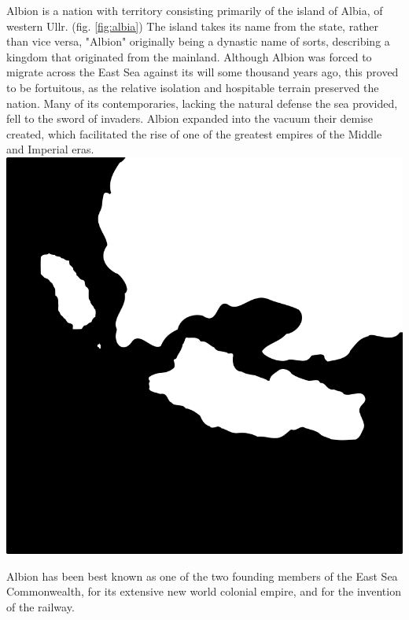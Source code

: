 

	Albion is a nation with territory consisting primarily of the island of Albia, of western Ullr. (fig. \ref{fig:albia})  The island takes its name from the state, rather than vice versa, "Albion" originally being a dynastic name of sorts, describing a kingdom that originated from the mainland.  Although Albion was forced to migrate across the East Sea against its will some thousand years ago, this proved to be fortuitous, as the relative isolation and hospitable terrain preserved the nation.  Many of its contemporaries, lacking the natural defense the sea provided, fell to the sword of invaders.  Albion expanded into the vacuum their demise created, which facilitated the rise of one of the greatest empires of the Middle and Imperial eras.\smallskip \\ 
	\includegraphics[width=\linewidth]{encyclopedia/images/albia}
	\label{fig:albia}

	\smallskip

	Albion has been best known as one of the two founding members of the East Sea Commonwealth, for its extensive new world colonial empire, and for the invention of the railway.
	
